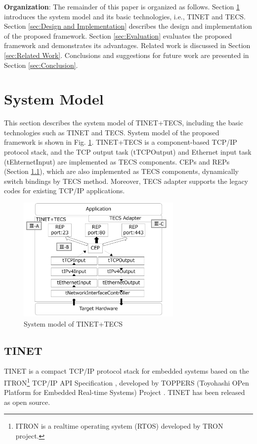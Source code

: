 \documentclass[conference]{IEEEtran/IEEEtran}
\begin{document}
{\bf Organization}: The remainder of this paper is organized as follows.
Section \ref{sec:System Model} introduces the system model and its basic technologies, i.e., TINET and TECS.
Section \ref{sec:Design and Implementation} describes the design and implementation of the proposed framework.
Section \ref{sec:Evaluation} evaluates the proposed framework and demonstrates its advantages.
Related work is discussed in Section \ref{sec:Related Work}.
Conclusions and suggestions for future work are presented in Section \ref{sec:Conclusion}.


\section{System Model}
\label{sec:System Model}

This section describes the system model of TINET+TECS, including the basic technologies such as TINET and TECS.
System model of the proposed framework is shown in Fig. \ref{fig:SystemModel}.
TINET+TECS is a component-based TCP/IP protocol stack, and the TCP output task (tTCPOutput) and Ethernet input task (tEhternetInput) are implemented as TECS components.
CEPs and REPs (Section \ref{sec:TINET}), which are also implemented as TECS components, dynamically switch bindings by TECS method.
Moreover, TECS adapter supports the legacy codes for existing TCP/IP applications.


\begin{figure}[t]
    \centering
    \includegraphics[width=8.0cm,clip]{figure/SystemModel.pdf}
    \caption{System model of TINET+TECS}
    \label{fig:SystemModel}
\end{figure}

\subsection{TINET}
\label{sec:TINET}

TINET is a compact TCP/IP protocol stack for embedded systems based on the ITRON\footnote{ITRON is a realtime operating system (RTOS) developed by TRON project.} TCP/IP API Specification \cite{url:ITRON_TCP/IP_API_Spec}, developed by TOPPERS (Toyohashi OPen Platform for Embedded Real-time Systems) Project \cite{url:TOPPERS}.
TINET has been released as open source.
\end{document}

